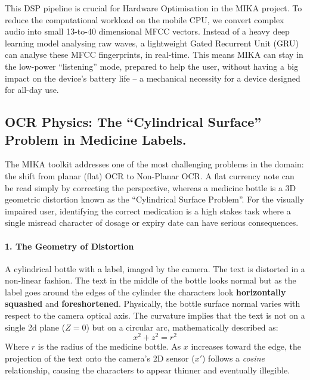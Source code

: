 \documentclass[12pt,a4paper]{report}
\begin{document}
\noindent This DSP pipeline is crucial for Hardware Optimisation in the MIKA project. To reduce the computational workload on the mobile CPU, we convert complex audio into small 13-to-40 dimensional MFCC vectors. Instead of a heavy deep learning model analysing raw waves, a lightweight Gated Recurrent Unit (GRU) can analyse these MFCC fingerprints, in real-time. This means MIKA can stay in the low-power “listening” mode, prepared to help the user, without having a big impact on the device’s battery life – a mechanical necessity for a device designed for all-day use.
 
\subsection{OCR Physics: The ``Cylindrical Surface'' Problem in Medicine Labels.}
 
The MIKA toolkit addresses one of the most challenging problems in the domain: the shift from planar (flat) OCR to Non-Planar OCR. A flat currency note can be read simply by correcting the perspective, whereas a medicine bottle is a 3D geometric distortion known as the “Cylindrical Surface Problem”. For the visually impaired user, identifying the correct medication is a high stakes task where a single misread character of dosage or expiry date can have serious consequences.
 
\paragraph{1. The Geometry of Distortion}
A cylindrical bottle with a label, imaged by the camera. The text is distorted in a non-linear fashion. The text in the middle of the bottle looks normal but as the label goes around the edges of the cylinder the characters look \textbf{horizontally squashed} and \textbf{foreshortened}.  Physically, the bottle surface normal varies with respect to the camera optical axis. The curvature implies that the text is not on a single 2d plane ($Z=0$) but on a circular arc, mathematically described as:
\begin{equation}
x^2 + z^2 = r^2
\end{equation}
Where $r$ is the radius of the medicine bottle. As $x$ increases toward the edge, the projection of the text onto the camera's 2D sensor ($x'$) follows a \textit{cosine} relationship, causing the characters to appear thinner and eventually illegible.
 
\end{document}
